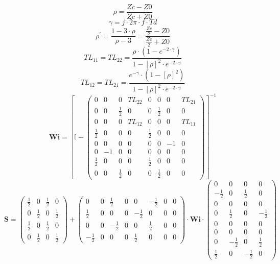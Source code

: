 \[ \rho =  \frac{ Zc-Z0 }{ Zc + Z0 } \]
\[ \gamma =  j \cdot 2 \pi \cdot f \cdot Td \]
\[ \rho^\prime = \frac{1-3\cdot \rho }{\rho - 3} =  \frac{ \frac{ Zc
}{2} - Z0  }{ \frac{ Zc }{2} + Z0 } \]
\[ TL_{11}=TL_{22} =  \frac{ \rho \cdot \left( 1 - e^{-2 \cdot \gamma
}  \right) }{ 1 - \left[ \rho \right]^2 \cdot e^{-2 \cdot \gamma }  }
\]
\[ TL_{12}=TL_{21} =  \frac{ e^{-\gamma} \cdot \left( 1 - \left[ \rho
\right] ^2 \right) }{ 1 - \left[ \rho \right]^2 \cdot e^{-2 \cdot
\gamma }  }  \]
\[ \mathbf{Wi} =  \left[ \mathbb{I}  - \left(\begin{smallmatrix} 0 & 0
& 0 & TL_{22} & 0 & 0 & 0 & TL_{21} \\ 0 & 0 &  \frac{ 1 }{2}  & 0 & 0
&  \frac{ 1 }{ 2 }  & 0 & 0 \\ 0 & 0 & 0 & TL_{12} & 0 & 0 & 0 &
TL_{11} \\  \frac{ 1 }{ 2 }  & 0 & 0 & 0 &  \frac{ 1 }{2}  & 0 & 0 & 0
\\ 0 & 0 & 0 & 0 & 0 & 0 & -1 & 0 \\ 0 & -1 & 0 & 0 & 0 & 0 & 0 & 0 \\
\frac{ 1 }{2}  & 0 & 0 & 0 &  \frac{ 1 }{ 2 }  & 0 & 0 & 0 \\ 0 & 0 &
\frac{ 1 }{ 2 }  & 0 & 0 &  \frac{ 1 }{2}  & 0 & 0
\end{smallmatrix}\right) \right]^{-1}  \]
\[ \mathbf{S} = \left(\begin{smallmatrix}  \frac{ 1 }{2}  & 0 &
\frac{ 1 }{ 2 }  & 0 \\ 0 &  \frac{ 1 }{2}  & 0 &  \frac{ 1 }{ 2 }  \\
\frac{ 1 }{ 2 }  & 0 &  \frac{ 1 }{2}  & 0 \\ 0 &  \frac{ 1 }{ 2 }  &
0 &  \frac{ 1 }{2}  \end{smallmatrix}\right) +
\left(\begin{smallmatrix} 0 & 0 &  \frac{ 1 }{ 2 }  & 0 & 0 &  -\frac{
1 }{ 2 }  & 0 & 0 \\  \frac{ 1 }{ 2 }  & 0 & 0 & 0 &  -\frac{ 1 }{ 2 }
& 0 & 0 & 0 \\ 0 & 0 &  -\frac{ 1 }{ 2 }  & 0 & 0 &  \frac{ 1 }{ 2 }
& 0 & 0 \\  -\frac{ 1 }{ 2 }  & 0 & 0 & 0 &  \frac{ 1 }{ 2 }  & 0 & 0
& 0 \end{smallmatrix}\right) \cdot \mathbf{Wi}
\cdot\left(\begin{smallmatrix} 0 & 0 & 0 & 0 \\  -\frac{ 1 }{ 2 }  & 0
&  \frac{ 1 }{ 2 }  & 0 \\ 0 & 0 & 0 & 0 \\ 0 &  \frac{ 1 }{ 2 }  & 0
&  -\frac{ 1 }{ 2 }  \\ 0 & 0 & 0 & 0 \\ 0 & 0 & 0 & 0 \\ 0 &  -\frac{
1 }{ 2 }  & 0 &  \frac{ 1 }{ 2 }  \\  \frac{ 1 }{ 2 }  & 0 &  -\frac{
1 }{ 2 }  & 0 \end{smallmatrix}\right) \]
